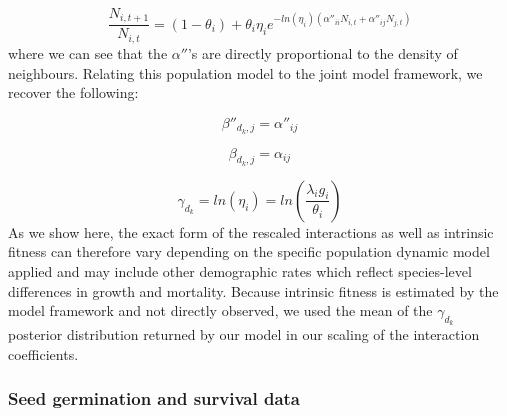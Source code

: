 \begin{refsection}
        \begin{equation}
            \frac{N_{i, t+1}}{N_{i, t}} = (1 - \theta_{i}) + \theta_{i} \eta_{i} e^{-ln(\eta_{i})({\alpha}''_{ii} N_{i, t} + {\alpha}''_{ij} N_{j, t})}
        \end{equation}
        where we can see that the ${\alpha}''$'s are directly proportional to the density of neighbours. Relating this population model to the joint model framework, we recover the following: 

        \begin{equation}
        {\beta}''_{d_k, j} = {\alpha}''_{ij}
        \end{equation}

        \begin{equation}
        \beta_{d_k, j} = \alpha_{ij}
        \end{equation}

        \begin{equation}
        \gamma_{d_k}  = ln(\eta_{i}) = ln(\frac{\lambda_{i} g_{i}}{\theta_{i}})
        \end{equation}
        As we show here, the exact form of the rescaled interactions as well as intrinsic fitness can therefore vary depending on the specific population dynamic model applied and may include other demographic rates which reflect species-level differences in growth and mortality. Because intrinsic fitness is estimated by the model framework and not directly observed, we used the mean of the $\gamma_{d_k}$ posterior distribution returned by our model in our scaling of the interaction coefficients.


        \subsubsection{Seed germination and survival data}
        \label{SI:germination}


\end{refsection}
